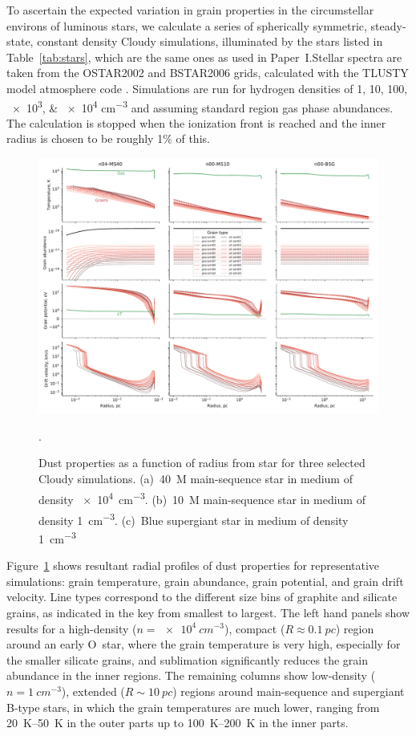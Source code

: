 To ascertain the expected variation in grain properties in the
circumstellar environs of luminous stars, we calculate a series of
spherically symmetric, steady-state, constant density Cloudy
simulations, illuminated by the stars listed in Table~\ref{tab:stars},
which are the same ones as used in Paper~I.\@ Stellar spectra are
taken from the OSTAR2002 and BSTAR2006 grids, calculated with the
TLUSTY model atmosphere code \citep{Lanz:2003a, Lanz:2007a}.
Simulations are run for hydrogen densities of \numlist{1;10;100;e3;e4}
\si{cm^{-3}} and assuming standard \hii{} region gas phase abundances.
The calculation is stopped when the ionization front is reached and
the inner radius is chosen to be roughly 1\% of this.



\begin{figure}
  \includegraphics[width=\linewidth]{figs/multi-dustprops}
  \caption{Dust properties as a function of radius from star for three
    selected Cloudy simulations. (a)~\SI{40}{M_\odot} main-sequence star in
    medium of density \SI{e4}{cm^{-3}}. (b)~\SI{10}{M_\odot} main-sequence
    star in medium of density \SI{1}{cm^{-3}}. (c)~Blue supergiant
    star in medium of density \SI{1}{cm^{-3}}}.
  \label{fig:multi-dustprops}
\end{figure}

Figure~\ref{fig:multi-dustprops} shows resultant radial profiles of
dust properties for representative simulations: grain temperature, grain
abundance, grain potential, and grain drift velocity.  Line types
correspond to the different size bins of graphite and silicate grains,
as indicated in the key from smallest to largest. The left hand panels
show results for a high-density (\(n = \SI{e4}{cm^{-3}}\)), compact
(\(R \approx \SI{0.1}{pc}\)) region around an early O~star, where the grain
temperature is very high, especially for the smaller silicate grains,
and sublimation significantly reduces the grain abundance in the inner
regions.  The remaining columns show low-density
(\(n = \SI{1}{cm^{-3}}\)), extended (\(R \sim \SI{10}{pc}\)) regions
around main-sequence and supergiant B-type stars, in which the grain
temperatures are much lower, ranging from \SIrange{20}{50}{K} in the
outer parts up to \SIrange{100}{200}{K} in the inner parts.

